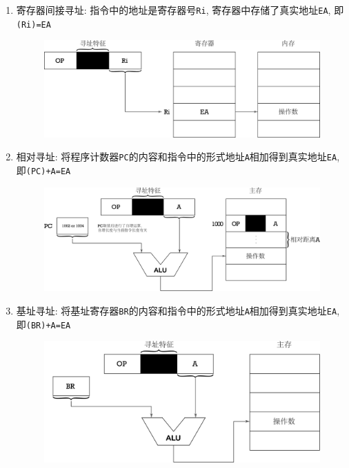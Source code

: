 \begin{enumerate}
\begin{figure}[H]
\end{figure}
\item 寄存器间接寻址: 指令中的地址是寄存器号\verb|Ri|, 寄存器中存储了真实地址\verb|EA|, 即\verb|(Ri)=EA|
\begin{figure}[H]
\centering
\includegraphics[scale=.4]{img/figure6.pdf}
\end{figure}
\item 相对寻址: 将程序计数器\verb|PC|的内容和指令中的形式地址\verb|A|相加得到真实地址\verb|EA|, 即\verb|(PC)+A=EA|
\begin{figure}[H]
\centering
\includegraphics[scale=.4]{img/figure7}
\end{figure}
\item 基址寻址: 将基址寄存器\verb|BR|的内容和指令中的形式地址\verb|A|相加得到真实地址\verb|EA|, 即\verb|(BR)+A=EA|
\begin{figure}[H]
\centering
\includegraphics[scale=.4]{img/figure8}
\end{figure}
\end{enumerate}

